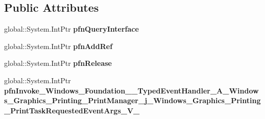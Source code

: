 \subsection*{Public Attributes}
\begin{DoxyCompactItemize}
\item 
\mbox{\label{struct_windows_1_1_foundation_1_1_typed_event_handler___a___windows___graphics___printing___prindf9d13d6fccfa5e25b1b30b98b5a86a9_a3d98094cf01ac5bea6989497390d7153}} 
global\+::\+System.\+Int\+Ptr {\bfseries pfn\+Query\+Interface}
\item 
\mbox{\label{struct_windows_1_1_foundation_1_1_typed_event_handler___a___windows___graphics___printing___prindf9d13d6fccfa5e25b1b30b98b5a86a9_a4c343d4eea077e3b33eca0ba68d45f57}} 
global\+::\+System.\+Int\+Ptr {\bfseries pfn\+Add\+Ref}
\item 
\mbox{\label{struct_windows_1_1_foundation_1_1_typed_event_handler___a___windows___graphics___printing___prindf9d13d6fccfa5e25b1b30b98b5a86a9_a1dc5d662ebfcf8ffc218b40ddabe585d}} 
global\+::\+System.\+Int\+Ptr {\bfseries pfn\+Release}
\item 
\mbox{\label{struct_windows_1_1_foundation_1_1_typed_event_handler___a___windows___graphics___printing___prindf9d13d6fccfa5e25b1b30b98b5a86a9_ac0443c595bbdd8b005561c1eac632b44}} 
global\+::\+System.\+Int\+Ptr {\bfseries pfn\+Invoke\+\_\+\+Windows\+\_\+\+Foundation\+\_\+\+\_\+\+Typed\+Event\+Handler\+\_\+\+A\+\_\+\+Windows\+\_\+\+Graphics\+\_\+\+Printing\+\_\+\+Print\+Manager\+\_\+j\+\_\+\+Windows\+\_\+\+Graphics\+\_\+\+Printing\+\_\+\+Print\+Task\+Requested\+Event\+Args\+\_\+\+V\+\_\+}
\end{DoxyCompactItemize}
